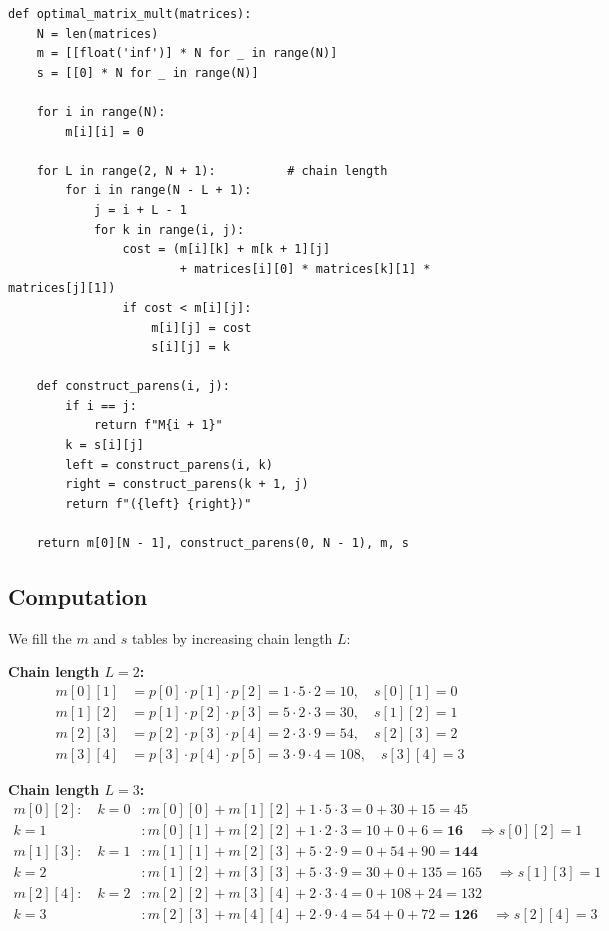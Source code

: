 \documentclass[12pt,a4paper]{article}
\begin{document}
\begin{verbatim}
def optimal_matrix_mult(matrices):
    N = len(matrices)
    m = [[float('inf')] * N for _ in range(N)]
    s = [[0] * N for _ in range(N)]

    for i in range(N):
        m[i][i] = 0

    for L in range(2, N + 1):          # chain length
        for i in range(N - L + 1):
            j = i + L - 1
            for k in range(i, j):
                cost = (m[i][k] + m[k + 1][j]
                        + matrices[i][0] * matrices[k][1] * matrices[j][1])
                if cost < m[i][j]:
                    m[i][j] = cost
                    s[i][j] = k

    def construct_parens(i, j):
        if i == j:
            return f"M{i + 1}"
        k = s[i][j]
        left = construct_parens(i, k)
        right = construct_parens(k + 1, j)
        return f"({left} {right})"

    return m[0][N - 1], construct_parens(0, N - 1), m, s
\end{verbatim}

\subsection*{Computation}

We fill the $m$ and $s$ tables by increasing chain length $L$:

\medskip
\noindent\textbf{Chain length $L = 2$:}
\begin{align*}
    m[0][1] &= p[0] \cdot p[1] \cdot p[2] = 1 \cdot 5 \cdot 2 = 10, \quad s[0][1] = 0 \\
    m[1][2] &= p[1] \cdot p[2] \cdot p[3] = 5 \cdot 2 \cdot 3 = 30, \quad s[1][2] = 1 \\
    m[2][3] &= p[2] \cdot p[3] \cdot p[4] = 2 \cdot 3 \cdot 9 = 54, \quad s[2][3] = 2 \\
    m[3][4] &= p[3] \cdot p[4] \cdot p[5] = 3 \cdot 9 \cdot 4 = 108, \quad s[3][4] = 3
\end{align*}

\noindent\textbf{Chain length $L = 3$:}
\begin{align*}
    m[0][2]: \quad k=0&: m[0][0] + m[1][2] + 1 \cdot 5 \cdot 3 = 0 + 30 + 15 = 45 \\
                  k=1&: m[0][1] + m[2][2] + 1 \cdot 2 \cdot 3 = 10 + 0 + 6 = \mathbf{16} \quad \Rightarrow s[0][2] = 1 \\[4pt]
    m[1][3]: \quad k=1&: m[1][1] + m[2][3] + 5 \cdot 2 \cdot 9 = 0 + 54 + 90 = \mathbf{144} \\
                  k=2&: m[1][2] + m[3][3] + 5 \cdot 3 \cdot 9 = 30 + 0 + 135 = 165 \quad \Rightarrow s[1][3] = 1 \\[4pt]
    m[2][4]: \quad k=2&: m[2][2] + m[3][4] + 2 \cdot 3 \cdot 4 = 0 + 108 + 24 = 132 \\
                  k=3&: m[2][3] + m[4][4] + 2 \cdot 9 \cdot 4 = 54 + 0 + 72 = \mathbf{126} \quad \Rightarrow s[2][4] = 3
\end{align*}
\end{document}

